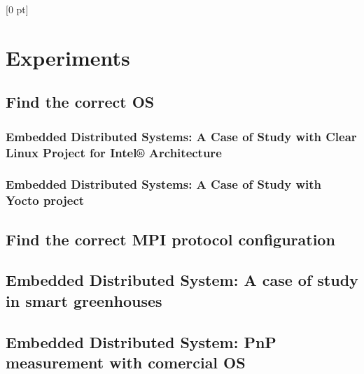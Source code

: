 \titlespacing{\chapter}{0 pt}{30 pt}{50 pt}[0 pt]
\titleformat{\section}{\Large\bfseries}{\thesection}{0 pt}{\hspace{30 pt}}
\titleformat{\subsection}{\large\bfseries}{\thesubsection}{0 pt}{\hspace{30 pt}}
\pagestyle{fancy}
\fancyhead[LO,LE]{\footnotesize\emph{\leftmark}}
\fancyhead[RO,RE]{\thepage}
\fancyfoot[CO,CE]{}

\chapter{Experiments}

\normalsize
\noindent

\section{Find the correct OS}
\noindent

    \subsection {Embedded Distributed Systems: A Case of Study with Clear Linux
    Project for Intel® Architecture}
    \noindent

    \subsection {Embedded Distributed Systems: A Case of Study with Yocto project}
    \noindent

\section{Find the correct MPI protocol configuration}
\noindent

\section{Embedded Distributed System: A case of study in smart greenhouses}
\noindent

\section{Embedded Distributed System: PnP measurement with comercial OS}
\noindent

\clearpage
